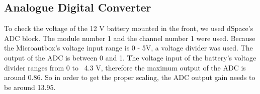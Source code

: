 \subsection{Analogue Digital Converter}

To check the voltage of the 12 V battery mounted in the front, we used dSpace's ADC block. The module number 1 and the channel number 1 were used. Because the Microautbox's voltage input range is 0 - 5V, a voltage divider was used. The output of the ADC is between 0 and 1. The voltage input of the battery's voltage divider ranges from 0 to ~4.3 V, therefore the maximum output of the ADC is around 0.86. So in order to get the proper scaling, the ADC output gain needs to be around 13.95. 
